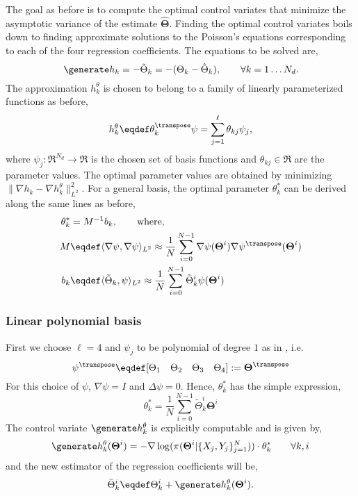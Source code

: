 The goal as before is to compute the optimal control variates that minimize the asymptotic variance of the estimate $\hat{\boldsymbol{\Theta}}$.
Finding the optimal control variates boils down to finding approximate  solutions to the Poisson's equations corresponding to each of the four regression coefficients. The equations to be solved are,
\begin{equation}
\generate h_k = -\tilde{\Theta}_k = - (\Theta_k - \hat{\Theta}_k), \qquad \forall k = 1 \dots N_d.
\label{e:poisson_logit}
\end{equation}
The approximation $h^\theta_k$ is chosen to belong to a family of linearly parameterized functions as before,
\[
h^\theta_k \eqdef \theta_k^\transpose \psi =  \sum_{j=1}^\ell \theta_{kj} \psi_j,
\]
where $\psi_j : \Re^{N_d} \to \Re$ is the chosen set of basis functions and $\theta_{kj} \in \Re$ are the parameter values.  The optimal parameter values are obtained by minimizing $ \| \nabla h_k - \nabla h^\theta_k \|^2_{L^2}$. For a general basis, the optimal parameter $\theta_k^*$  can be derived along the same lines as before,
\begin{equation}
\begin{aligned}
\theta_k^*  &= M^{-1} b_k, \qquad \text{where,}\\
M & \eqdef \langle \nabla \psi, \nabla \psi \rangle_{L^2} \approx \frac{1}{N} \sum_{i = 0}^{N-1}\nabla \psi(\boldsymbol{\Theta}^i) \nabla \psi^\transpose(\boldsymbol{\Theta}^i)\\
b_k & \eqdef \langle \tilde{\Theta}_k, \psi \rangle_{L^2} \approx \frac{1}{N} \sum_{i=0}^{N-1}\tilde{\Theta}_k^i \psi(\boldsymbol{\Theta}^i) \\
\label{e:theta_k}
\end{aligned}
\end{equation}
\noindent \subsubsection*{Linear polynomial basis}
First we choose $\ell=4$ and $\psi_j$ to be polynomial of degree $1$ as in \cite{papmirgir}, i.e.
\[
\psi^\transpose \eqdef [ \Theta_1 \quad \Theta_2 \quad \Theta_3 \quad \Theta_4] := \boldsymbol{\Theta}^\transpose
\]
For this choice of $\psi$,  $\nabla \psi = I$ and $ \Delta \psi = 0$. Hence, $\theta^*_k$ has the simple expression,
\begin{equation}
\theta^*_k = \frac{1}{N} \sum_{i=0}^{N-1} \tilde{\Theta}_k^i \boldsymbol{\Theta}^i
\label{e:theta_lin_polynomial}
\end{equation}
The control variate $\generate h^\theta_k$ is explicitly computable and is given by,
\[
\generate h^\theta_k(\boldsymbol{\Theta}^i) = -\nabla \log(\pi(\boldsymbol{\Theta}^i|\{X_j,Y_j\}_{j=1}^N)) \cdot \theta^*_k \qquad \forall k, i
\]
and the new estimator of the regression coefficients will be,
\[
\bar{\Theta}^i_k \eqdef \Theta^i_k + \generate h^\theta_k(\boldsymbol{\Theta}^i).
\]

